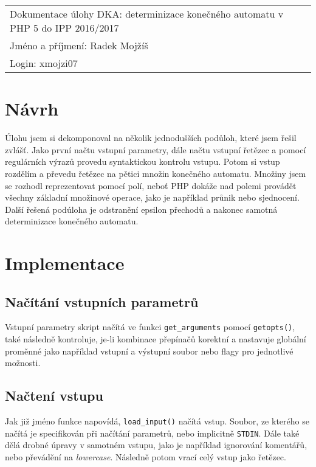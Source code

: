 \documentclass[a4paper, 10pt]{article}
\begin{document}
\begin{flushleft}
\begin{large}
\begin{tabular}{ll}
  Dokumentace úlohy DKA: determinizace konečného automatu v PHP 5 do IPP 2016/2017\\
  Jméno a příjmení: Radek Mojžíš\\
  Login: xmojzi07\\
\end{tabular}
\end{large}
\end{flushleft}
\section{Návrh}
Úlohu jsem si dekomponoval na několik jednodušších podůloh, které jsem řešil zvlášť. Jako první načtu vstupní parametry, dále načtu vstupní řetězec a pomocí regulárních výrazů provedu syntaktickou kontrolu vstupu. Potom si vstup rozdělím a převedu řetězec na pětici množin konečného automatu. Množiny jsem se rozhodl reprezentovat pomocí polí, neboť PHP dokáže nad polemi provádět všechny základní množinové operace, jako je například průnik nebo sjednocení. Další řešená podúloha je odstranění epsilon přechodů a nakonec samotná determinizace konečného automatu.

\section{Implementace}
\subsection{Načítání vstupních parametrů}
Vstupní parametry skript načítá ve funkci \texttt{get\_arguments} pomocí \texttt{getopts()}, také následně kontroluje, je-li kombinace přepínačů korektní a nastavuje globální proměnné jako například vstupní a výstupní soubor nebo flagy pro jednotlivé možnosti.

\subsection{Načtení vstupu}
Jak již jméno funkce napovídá, \texttt{load\_input()} načítá vstup. Soubor, ze kterého se načítá je specifikován při načítání parametrů, nebo implicitně \texttt{STDIN}. Dále také dělá drobné úpravy v samotném vstupu, jako je například ignorování komentářů, nebo převádění na \emph{lowercase}. Následně potom vrací celý vstup jako řetězec.
\end{document}
